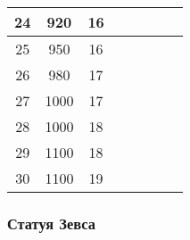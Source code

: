 \begin{longtable}[c]{|c|c|c|c|c|c|c|c|}
    \multirow{1}{*}{24} & \multirow{1}{*}{920} & \multirow{1}{*}{16} & & & & & \\\hline
    \multirow{1}{*}{25} & \multirow{1}{*}{950} & \multirow{1}{*}{16} & & & & & \\\hline
    \multirow{1}{*}{26} & \multirow{1}{*}{980} & \multirow{1}{*}{17} & & & & & \\\hline
    \multirow{1}{*}{27} & \multirow{1}{*}{1000} & \multirow{1}{*}{17} & & & & & \\\hline
    \multirow{1}{*}{28} & \multirow{1}{*}{1000} & \multirow{1}{*}{18} & & & & & \\\hline
    \multirow{1}{*}{29} & \multirow{1}{*}{1100} & \multirow{1}{*}{18} & & & & & \\\hline
    \multirow{1}{*}{30} & \multirow{1}{*}{1100} & \multirow{1}{*}{19} & & & & & \\\hline
\end{longtable}


\subsubsection{Статуя Зевса}


